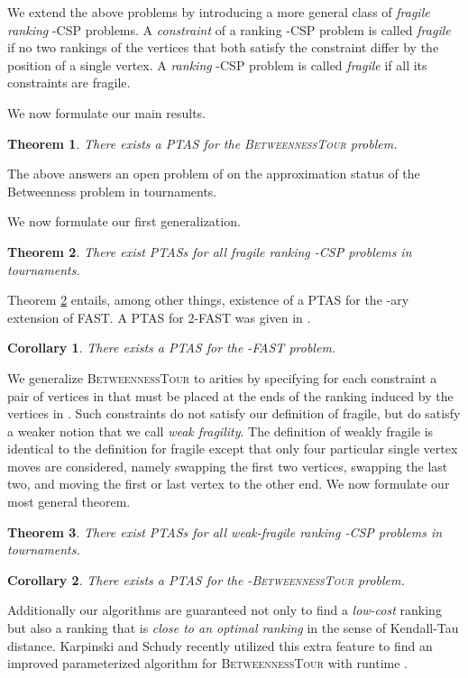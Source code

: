 \documentclass[dvips,11pt,letter]{article}
\newtheorem{theorem}{Theorem} \newtheorem{conjecture}[theorem]{Conjecture}
\newtheorem{anonCorollary}{Corollary}
\newcommand{\betTour}{\textsc{BetweennessTour}}
\newcommand{\fast}{\textsc{FAST}}
\begin{document}
{We extend the above problems by introducing a more general class of \emph{fragile ranking} -CSP problems.
A \emph{constraint}  of a ranking -CSP problem is called \emph{fragile} if no two rankings of the vertices  that both satisfy the constraint differ by the position of a single vertex.
A \emph{ranking} -CSP problem is called \emph{fragile} if all its
constraints are fragile.

We now formulate  our main results.
\begin{theorem} \label{thm:main}
There exists a PTAS for the \betTour{} problem.
\end{theorem}
The above answers an open problem of \cite{AA07} on the approximation status of the Betweenness problem in tournaments.

We now formulate our first generalization.
\begin{theorem} \label{thm:strongFragile}
There exist PTASs for all \emph{fragile ranking} -CSP problems in tournaments.
\end{theorem}

Theorem \ref{thm:strongFragile} entails, among other things, existence of a PTAS for the -ary
extension of \fast{}. A PTAS for 2-\fast{} was given in \cite{mathieu09fast}.

\begin{anonCorollary}
There exists a PTAS for the -\fast{} problem.
\end{anonCorollary}

We  generalize \betTour{} to arities  by specifying for each constraint  a pair of vertices in  that must be placed at the ends of the ranking induced by the vertices in . Such constraints do not satisfy our definition of fragile, but do satisfy a weaker notion that we call \emph{weak fragility}. The definition of weakly fragile is identical to the definition for fragile except that only four particular single vertex moves are considered, namely swapping the first two vertices, swapping the last two, and moving the first or last vertex to the other end.
We now formulate our most general theorem.
\begin{theorem} \label{thm:weakFragile}
There exist PTASs for all \emph{weak-fragile ranking} -CSP problems in tournaments.
\end{theorem}

\begin{anonCorollary}
There exists a PTAS for the -\betTour{} problem.
\end{anonCorollary}

Additionally our algorithms are guaranteed not only to find a \emph{low-cost} ranking but also a ranking that is \emph{close to an optimal ranking} in the sense of Kendall-Tau distance. Karpinski and Schudy \cite{karpinski10exact} recently utilized this extra feature to find an improved parameterized algorithm for \betTour{} with runtime .

}
\end{document}
